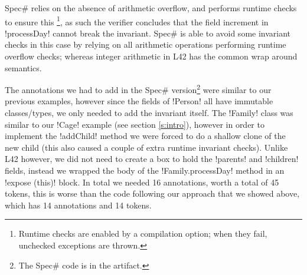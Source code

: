 Spec\# relies on the absence of arithmetic overflow, and performs runtime checks to ensure this%
\footnote{%
Runtime checks are enabled by a compilation option; when they fail, unchecked exceptions are thrown.%
}, as such the verifier concludes that the field increment in \Q!processDay! cannot break the invariant.
Spec\# is able to avoid some invariant checks in this case 
by relying on all arithmetic operations performing runtime overflow checks;
whereas integer arithmetic in L42 has the common wrap around semantics.









The annotations we had to add in the Spec\# version\footnote{The Spec\# code is in the artifact.} were similar to our previous examples, however since the fields of \Q!Person! all have immutable classes/types, we only needed to add the invariant itself. The \Q!Family! class was similar to our \Q!Cage! example (see section \ref{s:intro}), however in order to implement the \Q!addChild! method we were forced to do a shallow clone of the new child (this also caused a couple of extra runtime invariant checks). Unlike L42 however, we did not need to create a box to hold the \Q!parents! and \Q!children! fields, instead we wrapped the body of the \Q!Family.processDay! method in an \Q!expose (this)! block. In total we needed 16 annotations, worth a total of 45 tokens, this is worse than the code following our approach that we showed above, which has 14 annotations and 14 tokens.


